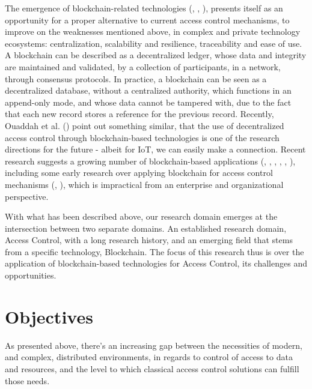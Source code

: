The emergence of blockchain-related technologies (\cite{nakamoto_bitcoin:_2008}, \cite{buterin_next-generation_2013}, \cite{wood_ethereum:_2014}), presents itself as an opportunity for a proper alternative to current access control mechanisms, to improve on the weaknesses mentioned above, in complex and private technology ecosystems: centralization, scalability and resilience, traceability and ease of use. A blockchain can be described as a decentralized ledger, whose data and integrity are maintained and validated, by a collection of participants, in a network, through consensus protocols. In practice, a blockchain can be seen as a decentralized database, without a centralized authority, which functions in an append-only mode, and whose data cannot be tampered with, due to the fact that each new record stores a reference for the previous record. Recently, Ouaddah et al. (\cite{ouaddah_access_2017}) point out something similar, that the use of decentralized access control through blockchain-based technologies is one of the research directions for the future - albeit for IoT, we can easily make a connection. Recent research suggests a growing number of blockchain-based applications (\cite{pilkington_blockchain_2015}, \cite{yermack_corporate_2017}, \cite{xu_blockchain_2016}, \cite{dorri_blockchain_2016}, \cite{fotiou_decentralized_2016}, \cite{augot_identity_2017}), including some early research over applying blockchain for access control mechanisms (\cite{maesa_blockchain_2017}, \cite{maesa_distributed_2017}), which is impractical from an enterprise and organizational perspective.

With what has been described above, our research domain emerges at the intersection between two separate domains. An established research domain, Access Control, with a long research history, and an emerging field that stems from a specific technology, Blockchain. The focus of this research thus is over the application of blockchain-based technologies for Access Control, its challenges and opportunities.

\section{Objectives}

As presented above, there's an increasing gap between the necessities of modern, and complex, distributed environments, in regards to control of access to data and resources, and the level to which classical access control solutions can fulfill those needs.

